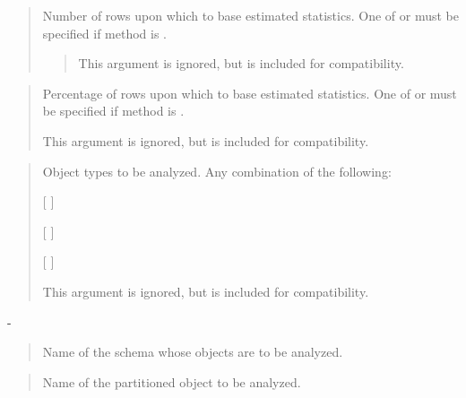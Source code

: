 \documentclass[letterpaper,10pt,english,openany,oneside]{sphinxmanual}
\begin{document}
\begin{quote}

Number of rows upon which to base estimated statistics. One of
 or  must be specified if method is
.
\begin{quote}

This argument is ignored, but is included for compatibility.
\end{quote}
\end{quote}

\begin{quote}

Percentage of rows upon which to base estimated statistics. One of
 or  must be specified if method is
.

This argument is ignored, but is included for compatibility.
\end{quote}

\begin{quote}

Object types to be analyzed. Any combination of the following:

{[}  {]}

{[} \sphinxcode{FOR ALL {[} INDEXED {]} COLUMNS {]} {[} SIZE n} {]}

{[}  {]}

This argument is ignored, but is included for compatibility.
\end{quote}

 - 

\begin{quote}

Name of the schema whose objects are to be analyzed.
\end{quote}

\begin{quote}

Name of the partitioned object to be analyzed.
\end{quote}
\end{document}
